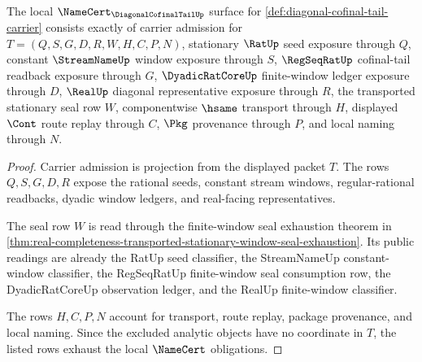 \begin{theorem}
\label{thm:diagonal-cofinal-tail-namecert-obligations}
The local $\NameCert_{\DiagonalCofinalTailUp}$ surface for \autoref{def:diagonal-cofinal-tail-carrier} consists exactly of carrier admission for $T=(Q,S,G,D,R,W,H,C,P,N)$, stationary $\RatUp$ seed exposure through $Q$, constant $\StreamNameUp$ window exposure through $S$, $\RegSeqRatUp$ cofinal-tail readback exposure through $G$, $\DyadicRatCoreUp$ finite-window ledger exposure through $D$, $\RealUp$ diagonal representative exposure through $R$, the transported stationary seal row $W$, componentwise $\hsame$ transport through $H$, displayed $\Cont$ route replay through $C$, $\Pkg$ provenance through $P$, and local naming through $N$.
\end{theorem}
\begin{proof}
Carrier admission is projection from the displayed packet $T$. The rows $Q,S,G,D,R$ expose the rational seeds, constant stream windows, regular-rational readbacks, dyadic window ledgers, and real-facing representatives.

The seal row $W$ is read through the finite-window seal exhaustion theorem in \autoref{thm:real-completeness-transported-stationary-window-seal-exhaustion}. Its public readings are already the RatUp seed classifier, the StreamNameUp constant-window classifier, the RegSeqRatUp finite-window seal consumption row, the DyadicRatCoreUp observation ledger, and the RealUp finite-window classifier.

The rows $H,C,P,N$ account for transport, route replay, package provenance, and local naming. Since the excluded analytic objects have no coordinate in $T$, the listed rows exhaust the local $\NameCert$ obligations.
\end{proof}


